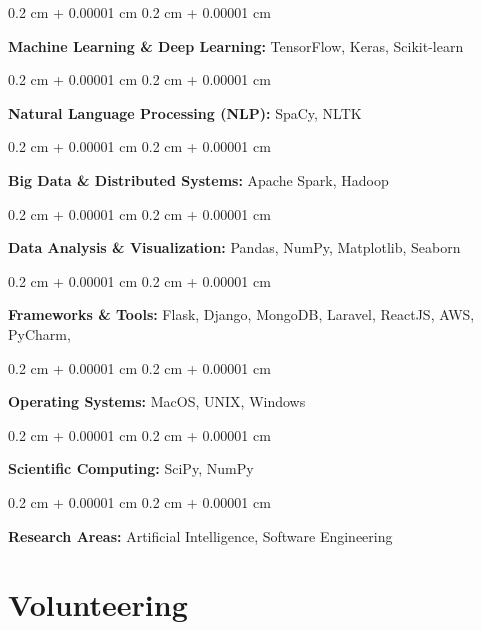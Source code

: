\documentclass[10pt, letterpaper]{article}
\newenvironment{onecolentry}{
    \begin{adjustwidth}{
        0.2 cm + 0.00001 cm
    }{
        0.2 cm + 0.00001 cm
    }
}{
    \end{adjustwidth}
} %
\begin{document}
        \begin{onecolentry}
            \textbf{Machine Learning \& Deep Learning:} TensorFlow, Keras, Scikit-learn
        \end{onecolentry}
        \vspace{0.2 cm}

        \begin{onecolentry}
            \textbf{Natural Language Processing (NLP):} SpaCy, NLTK
        \end{onecolentry}
        \vspace{0.2 cm}

        \begin{onecolentry}
            \textbf{Big Data \& Distributed Systems:} Apache Spark, Hadoop
        \end{onecolentry}
        \vspace{0.2 cm}
        \begin{onecolentry}
            \textbf{Data Analysis \& Visualization:} Pandas, NumPy, Matplotlib, Seaborn
        \end{onecolentry}
        \vspace{0.2 cm}

        \begin{onecolentry}
            \textbf{Frameworks \& Tools:} Flask, Django, MongoDB, Laravel, ReactJS, AWS, PyCharm, 
        \end{onecolentry}
        \vspace{0.2 cm}

        \begin{onecolentry}
            \textbf{Operating Systems:} MacOS, UNIX, Windows
        \end{onecolentry}
        \vspace{0.2 cm}

        \begin{onecolentry}
            \textbf{Scientific Computing:} SciPy, NumPy
        \end{onecolentry}
        \vspace{0.2 cm}

        \begin{onecolentry}
            \textbf{Research Areas:} Artificial Intelligence, Software Engineering
        \end{onecolentry}

    \section{Volunteering}
\end{document}
